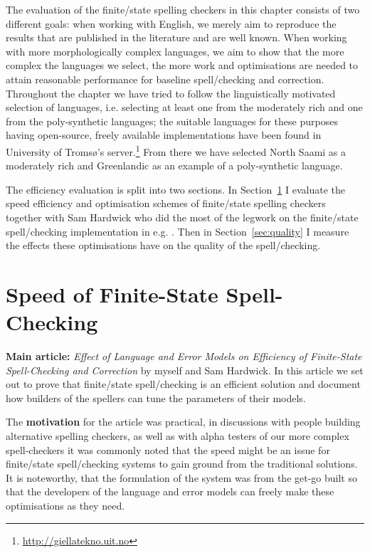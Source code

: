 \documentclass[officiallayout]{unihelcompling}
\begin{document}
The evaluation of the finite\-/state spelling checkers in this chapter consists
of two different goals: when working with English, we merely aim to reproduce
the results that are published in the literature and are well known. When
working with more morphologically complex languages, we aim to show that the
more complex the languages we select, the more work and optimisations are needed to
attain reasonable performance for baseline spell\-/checking and correction.
Throughout the chapter we have tried to follow the linguistically motivated
selection of languages, i.e. selecting at least one from the moderately rich
and one from the poly-synthetic languages; the suitable languages for these
purposes having open-source, freely available implementations have been found
in University of Tromsø's server.\footnote{\url{http://giellatekno.uit.no}}
From there we have selected North Saami as a moderately rich and Greenlandic as
an example of a poly-synthetic language.

The efficiency evaluation is split into two sections. In
Section~\ref{sec:speed} I evaluate the speed efficiency and optimisation
schemes of finite\-/state spelling checkers together with Sam Hardwick who did
the most of the legwork on the finite\-/state spell\-/checking implementation
in e.g.  \citep{linden2011hfst}. Then in Section~\ref{sec:quality} I measure
the effects these optimisations have on the quality of the spell\-/checking.

\section{Speed of Finite-State Spell-Checking}
\label{sec:speed}

\textbf{Main article:} \emph{Effect of Language and Error Models on Efficiency
of Finite-State Spell-Checking and Correction} by myself and Sam Hardwick. In
this article we set out to prove that finite\-/state spell\-/checking is an
efficient solution and document how builders of the spellers can tune the
parameters of their models.

The \textbf{motivation} for the article was practical, in discussions with
people building alternative spelling checkers, as well as with alpha testers of
our more complex spell-checkers it was commonly noted that the speed might be
an issue for finite\-/state spell\-/checking systems to gain ground from the
traditional solutions. It is noteworthy, that the formulation of the system was
from the get-go built so that the developers of the language and error models
can freely make these optimisations as they need.
\end{document}
